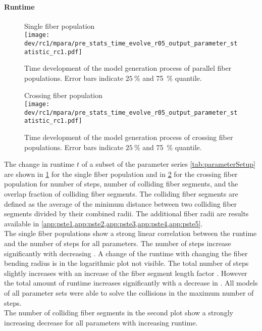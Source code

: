 \paragraph{Runtime}
% 
\begin{figure}[p]
\centering
Single fiber population\\[0em]
\texttt{[image: dev/rc1/mpara/pre\_stats\_time\_evolve\_r05\_output\_parameter\_statistic\_rc1.pdf]}
\caption[Time development parallel]{Time development of the model generation process of parallel fiber populations. Error bars indicate $\SI{25}{\percent}$ and \SI{75}{\percent} quantile.}
\label{fig:timeDevelopmentNone}
\end{figure}
% 
\begin{figure}[p]
\centering
Crossing fiber population\\[0ex]
\texttt{[image: dev/rc1/mpara/pre\_stats\_time\_evolve\_r05\_output\_parameter\_statistic\_rc1.pdf]}
\caption[Time development parallel]{Time development of the model generation process of crossing fiber populations. Error bars indicate $\SI{25}{\percent}$ and \SI{75}{\percent} quantile.}
\label{fig:timeDevelopmentCross}
\end{figure}
% 
The change in runtime $t$ of a subset of the parameter series \cref{tab:parameterSetup} are shown in \cref{fig:timeDevelopmentNone} for the single fiber population and in \cref{fig:timeDevelopmentCross} for the crossing fiber population for number of steps, number of colliding fiber segments, and the overlap fraction of colliding fiber segments.
The colliding fiber segments are defined as the average of the minimum distance between two colliding fiber segments divided by their combined radii.
The additional fiber radii are results available in \cref{app:pste1,app:pste2,app:pste3,app:pste4,app:pste5}.
\\
% 
The single fiber populations show a strong linear correlation between the runtime and the number of steps for all parameters.
The number of steps increase significantly with decreasing \segLengthFactor{}.
A change of the runtime with changing the fiber bending radius \segRadiusFactor{} is in the logarithmic plot not visible.
The total number of steps slightly  increases with an increase of the fiber segment length factor \segLengthFactor{}.
However the total amount of runtime increases significantly with a decrease in \segLengthFactor{}.
All models of all parameter sets were able to solve the collisions in the maximum number of steps.
\\
% 
The number of colliding fiber segments in the second plot show a strongly increasing decrease for all parameters with increasing runtime.
